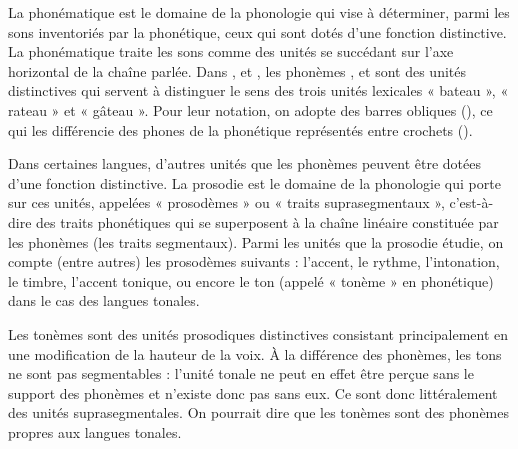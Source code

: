 La phonématique est le domaine de la phonologie qui vise à déterminer, parmi les sons inventoriés par la phonétique, ceux qui sont dotés d’une fonction distinctive. La phonématique traite les sons comme des unités se succédant sur l’axe horizontal de la chaîne parlée. Dans \bipa{[bato]}, \bipa{[rato]} et \bipa{[gato]}, les phonèmes ,  et  sont des unités distinctives qui servent à distinguer le sens des trois unités lexicales « bateau », « rateau » et « gâteau ». Pour leur notation, on adopte des barres obliques (\bipa{/ /}), ce qui les différencie des phones de la phonétique représentés entre crochets (\bipa{[ ]}).

Dans certaines langues, d’autres unités que les phonèmes peuvent être dotées d’une fonction distinctive. La prosodie est le domaine de la phonologie qui porte sur ces unités, appelées « prosodèmes » ou « traits suprasegmentaux », c’est-à-dire des traits phonétiques qui se superposent à la chaîne linéaire constituée par les phonèmes (les traits segmentaux). Parmi les unités que la prosodie étudie, on compte (entre autres) les prosodèmes suivants : l’accent, le rythme, l’intonation, le timbre, l’accent tonique, ou encore le ton (appelé « tonème » en phonétique) dans le cas des langues tonales.

Les tonèmes sont des unités prosodiques distinctives consistant principalement en une modification de la hauteur de la voix. À la différence des phonèmes, les tons ne sont pas segmentables : l’unité tonale ne peut en effet être perçue sans le support des phonèmes et n’existe donc pas sans eux. Ce sont donc littéralement des unités suprasegmentales. On pourrait dire que les tonèmes sont des phonèmes propres aux langues tonales.

